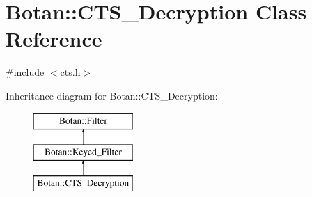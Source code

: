 \hypertarget{classBotan_1_1CTS__Decryption}{\section{Botan\-:\-:C\-T\-S\-\_\-\-Decryption Class Reference}
\label{classBotan_1_1CTS__Decryption}
}


{\ttfamily \#include $<$cts.\-h$>$}

Inheritance diagram for Botan\-:\-:C\-T\-S\-\_\-\-Decryption\-:\begin{figure}[H]
\begin{center}
\leavevmode
\includegraphics[height=3.000000cm]{classBotan_1_1CTS__Decryption}
\end{center}
\end{figure}
